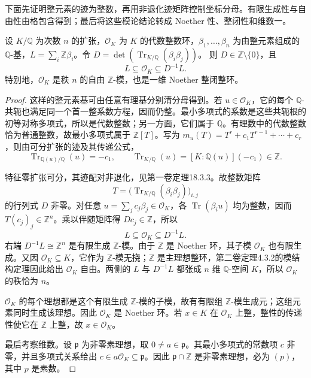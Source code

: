 下面先证明整元素的迹为整数，再用非退化迹矩阵控制坐标分母。有限生成性与自由性由格包含得到；最后将这些模论结论转成 Noether 性、整闭性和维数一。

\begin{theorem}\label{b3:thm:number-field-integral-lattice}
	设 \(K/\mathbb Q\) 为次数 \(n\) 的扩张，\(\mathcal O_K\) 为 \(K\) 的代数整数环，\(\beta_1,\ldots,\beta_n\) 为由整元素组成的 \(\mathbb Q\)-基，\(L=\sum_i\mathbb Z\beta_i\)。令 \(D=\det(\operatorname{Tr}_{K/\mathbb Q}(\beta_i\beta_j))\)。 则 \(D\in\mathbb Z\setminus\{0\}\)，且
	\[
		L\subseteq\mathcal O_K\subseteq D^{-1}L.
	\]
	特别地，\(\mathcal O_K\) 是秩 \(n\) 的自由 \(\mathbb Z\)-模，也是一维 Noether 整闭整环。
\end{theorem}
\begin{proof}
	这样的整元素基可由任意有理基分别清分母得到。若 \(u\in\mathcal O_K\)，它的每个 \(\mathbb Q\)-共轭也满足同一个首一整系数方程，因而仍整。最小多项式的系数是这些共轭根的初等对称多项式，所以是代数整数；另一方面，它们属于 \(\mathbb Q\)。有理数中的代数整数恰为普通整数，故最小多项式属于 \(\mathbb Z[T]\)。写为 \(m_u(T)=T^r+c_1T^{r-1}+\cdots+c_r\)，则由可分扩张的迹及其传递公式，
	\[
		\operatorname{Tr}_{\mathbb Q(u)/\mathbb Q}(u)=-c_1,\qquad \operatorname{Tr}_{K/\mathbb Q}(u)=[K:\mathbb Q(u)](-c_1)\in\mathbb Z.
	\]

	特征零扩张可分，其迹配对非退化，见第一卷定理18.3.3。故整数矩阵
	\[
		T=\bigl(\operatorname{Tr}_{K/\mathbb Q}(\beta_i\beta_j)\bigr)_{i,j}
	\]
	的行列式 \(D\) 非零。对任意 \(u=\sum_jc_j\beta_j\in\mathcal O_K\)，各 \(\operatorname{Tr}(\beta_i u)\) 均为整数，因而 \(T(c_j)_j\in\mathbb Z^n\)。乘以伴随矩阵得 \(Dc_j\in\mathbb Z\)，所以
	\[
		L\subseteq\mathcal O_K\subseteq D^{-1}L.
	\]
	右端 \(D^{-1}L\cong\mathbb Z^n\) 是有限生成 \(\mathbb Z\)-模。由于 \(\mathbb Z\) 是 Noether 环，其子模 \(\mathcal O_K\) 也有限生成。又因 \(\mathcal O_K\subseteq K\)，它作为 \(\mathbb Z\)-模无挠；\(\mathbb Z\) 是主理想整环，第二卷定理4.3.2的模结构定理因此给出 \(\mathcal O_K\) 自由。两侧的 \(L\) 与 \(D^{-1}L\) 都张成 \(n\) 维 \(\mathbb Q\)-空间 \(K\)，所以 \(\mathcal O_K\) 的秩恰为 \(n\)。

	\(\mathcal O_K\) 的每个理想都是这个有限生成 \(\mathbb Z\)-模的子模，故有有限组 \(\mathbb Z\)-模生成元；这组元素同时生成该理想。因此 \(\mathcal O_K\) 是 Noether 环。若 \(x\in K\) 在 \(\mathcal O_K\) 上整，整性的传递性使它在 \(\mathbb Z\) 上整，故 \(x\in\mathcal O_K\)。

	最后考察维数。设 \(\mathfrak p\) 为非零素理想，取 \(0\ne a\in\mathfrak p\)。其最小多项式的常数项 \(c\) 非零，并且多项式关系给出 \(c\in a\mathcal O_K\subseteq\mathfrak p\)。因此 \(\mathfrak p\cap\mathbb Z\) 是非零素理想，必为 \((p)\)，其中 \(p\) 是素数。


\end{proof}
